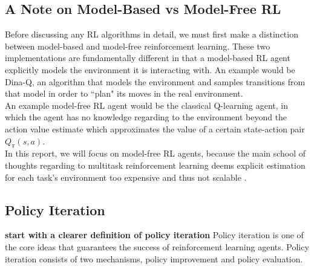 \documentclass[12pt]{report}
\begin{document}
\subsection{A Note on Model-Based vs Model-Free RL}
Before discussing any RL algorithms in detail, we must first make a distinction between model-based and model-free reinforcement learning. These two implementations are fundamentally different in that a model-based RL agent explicitly models the environment it is interacting with. An example would be Dina-Q, an algorithm that models the environment and samples transitions from that model in order to ``plan" its moves in the real environment.\\

An example model-free RL agent would be the classical Q-learning agent, in which the agent has no knowledge regarding to the environment beyond the action value estimate which approximates the value of a certain state-action pair $Q_\pi(s,a)$.\\

In this report, we will focus on model-free RL agents, because the main school of thoughts regarding to multitask reinforcement learning deems explicit estimation for each task's environment too expensive and thus not scalable \cite{sharma2017online}.

\subsection{Policy Iteration} \label{sec:policy-iter}

\textbf{start with a clearer definition of policy iteration}
Policy iteration is one of the core ideas that guarantees the success of reinforcement learning agents. Policy iteration consists of two mechanisms, policy improvement and policy evaluation.\\
\end{document}
